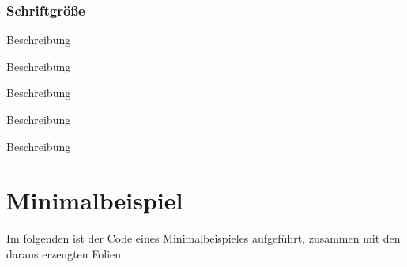 \documentclass[cmyk,a4paper,colorscheme=green,TUBStitlepage=picture]{tubsreprt}
\begin{document}





\subsection{Schriftgröße}

\begin{classoption}{9pt}
  Beschreibung
\end{classoption}

\begin{classoption}{10pt}
  Beschreibung
\end{classoption}

\begin{classoption}{11pt}
  Beschreibung
\end{classoption}

\begin{classoption}{12pt}
  Beschreibung
\end{classoption}

\begin{classoption}{14pt}
  Beschreibung
\end{classoption}


\chapter{Minimalbeispiel}

Im folgenden ist der Code eines Minimalbeispieles aufgeführt, zusammen mit den
daraus erzeugten Folien.
\end{document}
